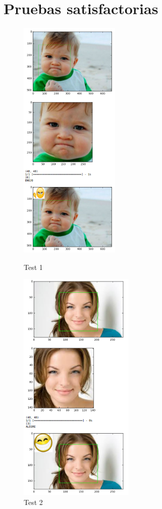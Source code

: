 \section{Pruebas satisfactorias}
\label{sec:testing}
\begin{frame}

\begin{figure}[!htbp]
    
    \begin{multicols}{2}
     \includegraphics[angle=0,width=48mm]{Imagenes/test1.png}
       \caption{Test 1}
       \label{fig:test1}   
       
       \includegraphics[angle=0,width=55mm]{Imagenes/test2.png}
           \caption{Test 2}
           \label{fig:test2} 
           
    \end{multicols}
        
\end{figure}
\end{frame}


